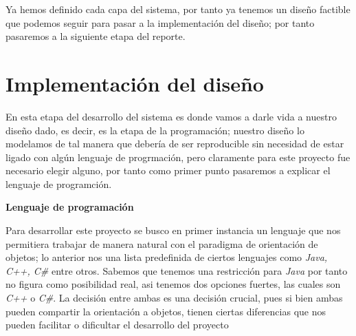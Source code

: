 \documentclass[10pt,letterpaper]{report}
\begin{document}
\vspace{0.2cm}

\noindent Ya hemos definido cada capa del sistema, por tanto ya tenemos un diseño factible que podemos seguir para pasar a la implementación del diseño; por tanto pasaremos a la siguiente etapa del reporte.

    \chapter{Implementación del diseño}

    \noindent En esta etapa del desarrollo del sistema es donde vamos a darle vida a nuestro diseño dado, es decir, es la etapa de la programación; nuestro diseño lo modelamos de tal manera que debería de ser reproducible sin necesidad de estar ligado con algún lenguaje de progrmación, pero claramente para este proyecto fue necesario elegir alguno, por tanto como primer punto pasaremos a explicar el lenguaje de programción.

    \vspace{0.2cm}

    \noindent \textbf{Lenguaje de programación}

    \noindent Para desarrollar este proyecto se busco en primer instancia un lenguaje que nos permitiera trabajar de manera natural con el paradigma de orientación de objetos; lo anterior nos una lista predefinida de ciertos lenguajes como \textit{Java, C++, C\#} entre otros. Sabemos que tenemos una restricción para \textit{Java} por tanto no figura como posibilidad real, asi tenemos dos opciones fuertes, las cuales son \textit{C++} o \textit{C\#}. 
    La decisión entre ambas es una decisión crucial, pues si bien ambas pueden compartir la orientación a objetos, tienen ciertas diferencias que nos pueden facilitar o dificultar el desarrollo del proyecto
\end{document}
